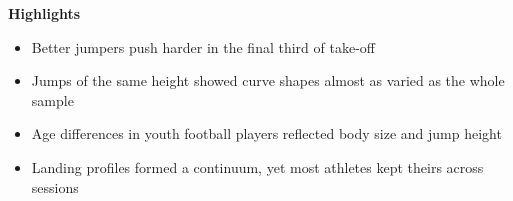 \documentclass[12pt,a4paper]{article}
\begin{document}
\noindent\textbf{Highlights}
\begin{itemize}
\item Better jumpers push harder in the final third of take-off
\item Jumps of the same height showed curve shapes almost as varied as the whole sample
\item Age differences in youth football players reflected body size and jump height
\item Landing profiles formed a continuum, yet most athletes kept theirs across sessions
\end{itemize}
\end{document}
